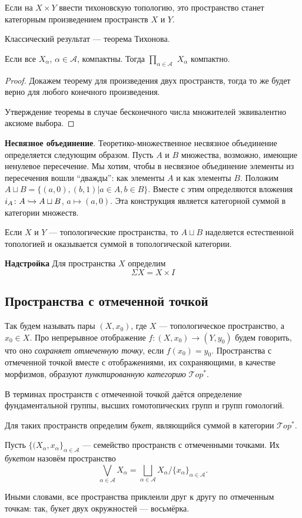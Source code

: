 Если на $X\times Y$ ввести тихоновскую топологию, это пространство станет категорным произведением пространств $X$ и $Y$.

Классический результат --- теорема Тихонова.
\begin{theorem}
	Если все $X_{\alpha}$, $\alpha\in\mathcal{A}$, компактны. Тогда $\prod\limits_{\alpha\in\mathcal{A}}$ $X_{\alpha}$ компактно.
\end{theorem}
\begin{proof}
Докажем теорему для произведения двух пространств, тогда то же будет верно для любого конечного произведения.

Утверждение теоремы в случае бесконечного числа множителей эквивалентно аксиоме выбора.
\end{proof}

\textbf{Несвязное объединение}. Теоретико-множественное несвязное объединение определяется следующим образом. Пусть $A$ и $B$ множества, возможно, имеющие ненулевое пересечение. Мы хотим, чтобы в несвязное объединение элементы из пересечения вошли ``дважды'': как элементы $A$ и как элементы $B$. Положим $A\sqcup B=\{(a,0), (b,1)|a\in A, b\in B\}$. Вместе с этим определяются вложения $i_A\colon A\xhookrightarrow{} A\sqcup B$, $a\mapsto (a,0)$. Эта конструкция является категорной суммой в категории множеств.

Если $X$ и $Y$ --- топологические пространства, то $A\sqcup B$ наделяется естественной топологией и оказывается суммой в топологической категории.

\textbf{Надстройка} Для пространства $X$ определим
	\begin{equation*}
		\Sigma X=X\times I
	\end{equation*}

\subsection{Пространства с отмеченной точкой}
Так будем называть пары $(X,x_0)$, где $X$ --- топологическое пространство, а $x_0\in X$. Про непрерывное отображение $f\colon(X,x_0)\to (Y,y_0)$ будем говорить, что оно \textit{сохраняет отмеченную точку}, если $f(x_0)=y_0$. Пространства с отмеченной точкой вместе с отображениями, их сохраняющими, в качестве морфизмов, образуют \textit{пунктированную категорию} $\mathcal{T}op^*$.

В терминах пространств с отмеченной точкой даётся определение фундаментальной группы, высших гомотопических групп и групп гомологий.

Для таких пространств определим \textit{букет}, являющийся суммой в категории $\mathcal{T}op^*$.
\begin{defin}
	Пусть $\{(X_{\alpha},x_{\alpha}\}_{\alpha\in\mathcal{A}}$ --- семейство пространств с отмеченными точками. Их \textit{букетом} назовём пространство
		\begin{equation*}
			\bigvee\limits_{\alpha\in\mathcal{A}}X_{\alpha}=\bigsqcup\limits_{\alpha\in\mathcal{A}}X_{\alpha}\big/\{x_\alpha\}_{\alpha\in\mathcal{A}}.
		\end{equation*}
\end{defin}
Иными словами, все пространства приклеили друг к другу по отмеченным точкам: так, букет двух окружностей --- восьмёрка.

